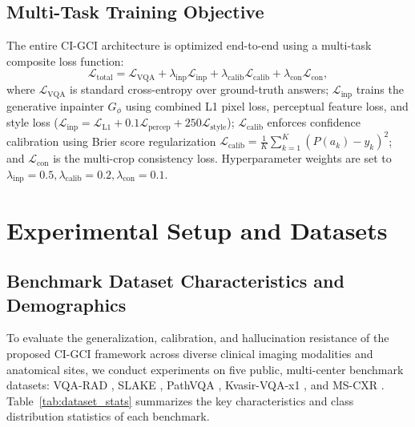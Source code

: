 \documentclass[journal,twoside,web]{ieeecolor}
\begin{document}
\subsection{Multi-Task Training Objective}
The entire CI-GCI architecture is optimized end-to-end using a multi-task composite loss function:
\begin{equation}
\mathcal{L}_{\text{total}} = \mathcal{L}_{\text{VQA}} + \lambda_{\text{inp}} \mathcal{L}_{\text{inp}} + \lambda_{\text{calib}} \mathcal{L}_{\text{calib}} + \lambda_{\text{con}} \mathcal{L}_{\text{con}},
\label{eq:total_loss}
\end{equation}
where $\mathcal{L}_{\text{VQA}}$ is standard cross-entropy over ground-truth answers; $\mathcal{L}_{\text{inp}}$ trains the generative inpainter $G_{\phi}$ using combined L1 pixel loss, perceptual feature loss, and style loss ($\mathcal{L}_{\text{inp}} = \mathcal{L}_{\text{L1}} + 0.1 \mathcal{L}_{\text{percep}} + 250 \mathcal{L}_{\text{style}}$); $\mathcal{L}_{\text{calib}}$ enforces confidence calibration using Brier score regularization $\mathcal{L}_{\text{calib}} = \frac{1}{K} \sum_{k=1}^K (P(a_k) - y_k)^2$; and $\mathcal{L}_{\text{con}}$ is the multi-crop consistency loss. Hyperparameter weights are set to $\lambda_{\text{inp}}=0.5, \lambda_{\text{calib}}=0.2, \lambda_{\text{con}}=0.1$.

\section{Experimental Setup and Datasets}
\label{sec:datasets}

\subsection{Benchmark Dataset Characteristics and Demographics}
To evaluate the generalization, calibration, and hallucination resistance of the proposed CI-GCI framework across diverse clinical imaging modalities and anatomical sites, we conduct experiments on five public, multi-center benchmark datasets: VQA-RAD \cite{lau2018}, SLAKE \cite{liu2021}, PathVQA \cite{he2020pathvqa}, Kvasir-VQA-x1 \cite{jha2023}, and MS-CXR \cite{boecking2022}. Table~\ref{tab:dataset_stats} summarizes the key characteristics and class distribution statistics of each benchmark.
\end{document}

